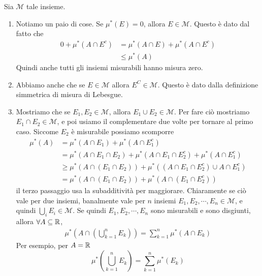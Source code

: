\documentclass[a4paper]{article}
\begin{document}
\begin{snippetproof}{}
    Sia \(\mathcal{M}\) tale insieme.
    \begin{enumerate}
        \item Notiamo un paio di cose. Se \(\mu^*(E) = 0\), allora \(E \in \mathcal{M}\).
        Questo è dato dal fatto che
        \begin{align*}
            0 + \mu^*(A \cap E^c) &= \mu^*(A \cap E) + \mu^*(A \cap E^c) \\
            &\leq \mu^*(A)
        \end{align*}
        Quindi anche tutti gli insiemi misurabili hanno misura zero.
        \item Abbiamo anche che se \(E \in \mathcal{M}\) allora \(E^C \in \mathcal{M}\).
        Questo è dato dalla definizione simmetrica di misura di Lebesgue.
        \item Mostriamo che se \(E_1, E_2 \in \mathcal{M}\), allora \(E_1 \cup E_2 \in \mathcal{M}\).
        Per fare ciò mostriamo \(E_1 \cap E_2 \in \mathcal{M}\), e poi usiamo il complementare due volte
        per tornare al primo caso. Siccome \(E_2\) è misurabile possiamo scomporre
        \begin{align*}
            \mu^*(A) &= \mu^*(A \cap E_1) + \mu^*(A \cap E_1^c) \\
            &= \mu^*(A \cap E_1 \cap E_2) + \mu^*(A \cap E_1 \cap E_2^c) + \mu^*(A \cap E_1^c) \\
            &\geq \mu^*(A \cap (E_1 \cap E_2)) + \mu^*((A \cap E_1 \cap E_2^c) \cup A \cap E_1^c) \\
            &= \mu^*(A \cap (E_1 \cap E_2)) + \mu^*(A \cap (E_1 \cap E_2^c))
        \end{align*}
        il terzo passaggio usa la subadditività per maggiorare. Chiaramente se ciò vale per due insiemi,
        banalmente vale per \(n\) insiemi \(E_1, E_2, \cdots, E_n \in \mathcal{M}\),
        e quindi \(\bigcup_i E_i \in \mathcal{M}\).
        Se quindi \(E_1, E_2, \cdots, E_n\) sono misurabili e sono disgiunti, allora
        \(\forall A \subseteq \mathbb{R}\),
        \begin{align*}
            \mu^*\left(
                A \cap \left(
                    \bigcup_{k=1}^n E_k
                \right)
            \right)
            = \sum_{k=1}^n \mu^*(A \cap E_k)
        \end{align*}
        Per esempio, per \(A= \mathbb{R}\)
        \[
            \mu^*\left(\bigcup_{k=1}^n E_k\right)
            = \sum_{k=1}^n \mu^*(E_k)
\]
\end{enumerate}
\end{snippetproof}
\end{document}
